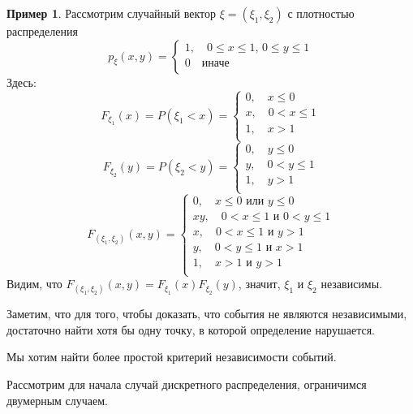 \documentclass[11pt,openany,a4paper]{scrartcl}
\theoremstyle{plain}
\theoremstyle{definition}
\newtheorem{example}[theorem]{Пример}
\begin{document}
\begin{example}
        Рассмотрим случайный вектор $\xi = (\xi_1, \xi_2)$ с плотностью 
        распределения
        $$
        p_\xi(x, y) =
        \begin{cases}
            1,\quad 0\leqslant x \leqslant 1,\, 0\leqslant y \leqslant 1 \\
            0\quad \text{иначе} \\
        \end{cases}
        $$
        Здесь:
        $$
        F_{\xi_1}(x) = P(\xi_1 < x) =
        \begin{cases}
            0,\quad x\leqslant 0 \\
            x,\quad 0 < x \leqslant 1 \\
            1,\quad x > 1 \\
        \end{cases}
        $$
        $$
        F_{\xi_2}(y) = P(\xi_2 < y) =
        \begin{cases}
            0,\quad y\leqslant 0 \\
            y,\quad 0 < y \leqslant 1 \\
            1,\quad y > 1 \\
        \end{cases}
        $$
        $$
        F_{(\xi_1, \xi_2)}(x, y) =
        \begin{cases}
            0,\quad x\leqslant 0 \text{ или } y \leqslant 0 \\
            xy,\quad 0 < x \leqslant 1 \text{ и } 0 < y \leqslant 1 \\
            x,\quad 0 < x \leqslant 1 \text{ и } y > 1 \\
            y,\quad 0 < y \leqslant 1 \text{ и } x > 1 \\
            1,\quad x > 1 \text{ и } y > 1 \\
        \end{cases}
        $$
        Видим, что $F_{(\xi_1, \xi_2)}(x, y) = F_{\xi_1}(x)F_{\xi_2}(y)$, значит,
        $\xi_1$ и $\xi_2$ независимы.
\end{example}

Заметим, что для того, чтобы доказать, что события не являются независимыми,
достаточно найти хотя бы одну точку, в которой определение нарушается.

Мы хотим найти более простой критерий независимости событий.

Рассмотрим для начала случай дискретного распределения, ограничимся двумерным 
случаем.
\end{document}
